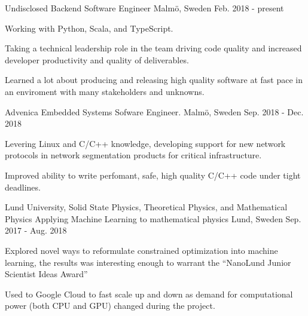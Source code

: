 


\begin{cventries}


\cventry
{Undisclosed} %
{Backend Software Engineer} %
{Malmö, Sweden} %
{Feb. 2018 - present} %
{ %
\begin{cvitems}
\item {Working with Python, Scala, and TypeScript.}
\item {Taking a technical leadership role in the team driving code quality
       and increased developer productivity and quality of deliverables.}
\item {Learned a lot about producing and releasing high quality
       software at fast pace in an enviroment with many stakeholders and
       unknowns.}
\end{cvitems}
}


\cventry
{Advenica} %
{Embedded Systems Sofware Engineer.} %
{Malmö, Sweden} %
{Sep. 2018 - Dec. 2018} %
{ %
\begin{cvitems}
\item {
Levering Linux and C/C++ knowledge, developing support for new network
protocols in network segmentation products for critical infrastructure.}
\item {
Improved ability to write perfomant, safe, high quality C/C++ code under tight
deadlines.}
\end{cvitems}
}

\cventry
{Lund University, Solid State Physics, Theoretical Physics, and Mathematical Physics} %
{Applying Machine Learning to mathematical physics } %
{Lund, Sweden} %
{Sep. 2017 - Aug. 2018} %
{ %
\begin{cvitems}
\item {Explored novel ways to reformulate constrained optimization into
machine learning, the results was interesting enough to warrant the ``NanoLund Junior Scientist Ideas Award''}
\item {Used to Google Cloud to fast scale up and down as demand for
computational power (both CPU and GPU) changed during the project.}
\end{cvitems}
}


\end{cventries}

